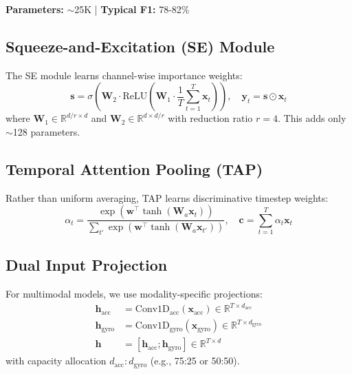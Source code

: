 \documentclass{article}
\begin{document}
\textbf{Parameters:} $\sim$25K | \textbf{Typical F1:} 78-82\%

\subsection{Squeeze-and-Excitation (SE) Module}

The SE module learns channel-wise importance weights:
\begin{equation}
    \mathbf{s} = \sigma\left(\mathbf{W}_2 \cdot \text{ReLU}\left(\mathbf{W}_1 \cdot \frac{1}{T}\sum_{t=1}^{T} \mathbf{x}_t\right)\right), \quad \mathbf{y}_t = \mathbf{s} \odot \mathbf{x}_t
    \label{eq:se}
\end{equation}
where $\mathbf{W}_1 \in \mathbb{R}^{d/r \times d}$ and $\mathbf{W}_2 \in \mathbb{R}^{d \times d/r}$ with reduction ratio $r=4$. This adds only $\sim$128 parameters.

\subsection{Temporal Attention Pooling (TAP)}

Rather than uniform averaging, TAP learns discriminative timestep weights:
\begin{equation}
    \alpha_t = \frac{\exp(\mathbf{w}^\top \tanh(\mathbf{W}_a \mathbf{x}_t))}{\sum_{t'} \exp(\mathbf{w}^\top \tanh(\mathbf{W}_a \mathbf{x}_{t'}))}, \quad \mathbf{c} = \sum_{t=1}^{T} \alpha_t \mathbf{x}_t
    \label{eq:tap}
\end{equation}

\subsection{Dual Input Projection}

For multimodal models, we use modality-specific projections:
\begin{align}
    \mathbf{h}_{\text{acc}} &= \text{Conv1D}_{\text{acc}}(\mathbf{x}_{\text{acc}}) \in \mathbb{R}^{T \times d_{\text{acc}}} \\
    \mathbf{h}_{\text{gyro}} &= \text{Conv1D}_{\text{gyro}}(\mathbf{x}_{\text{gyro}}) \in \mathbb{R}^{T \times d_{\text{gyro}}} \\
    \mathbf{h} &= [\mathbf{h}_{\text{acc}}; \mathbf{h}_{\text{gyro}}] \in \mathbb{R}^{T \times d}
    \label{eq:dual_proj}
\end{align}
with capacity allocation $d_{\text{acc}} : d_{\text{gyro}}$ (e.g., 75:25 or 50:50).
\end{document}
